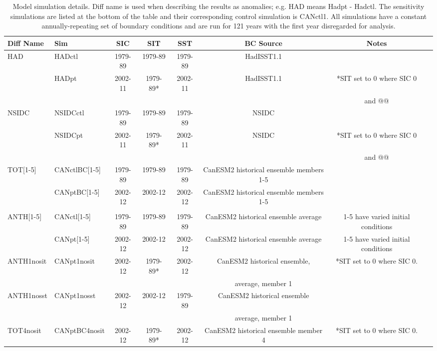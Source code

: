 \documentclass[twocol]{ametsoc}
\begin{document}
\begin{table}[t]
\caption{Model simulation details. Diff name is used when describing the results as anomalies; e.g. HAD means Hadpt - Hadctl. The sensitivity simulations are listed at the bottom of the table and their corresponding control simulation is CANctl1. All simulations have a constant annually-repeating set of boundary conditions and are run for 121 years with the first year disregarded for analysis.}\label{simstbl}
\begin{center}
\begin{tabular}{llcccccc}
\hline\hline
Diff Name & Sim & SIC & SIT & SST & BC Source & Notes\\
\hline
HAD &  HADctl   & 1979-89 & 1979-89 & 1979-89 & HadISST1.1 \\
         & HADpt &   2002-11 & 1979-89* & 2002-11 & HadISST1.1 & *SIT set to 0 where SIC 0 \\
            &                 &               &                &                &                     &     and @@\\
 NSIDC & NSIDCctl  &1979-89 & 1979-89 & 1979-89 & NSIDC \\
             & NSIDCpt &   2002-11 & 1979-89* & 2002-11 & NSIDC & *SIT set to 0 where SIC 0 \\
               &              &                &                 &               &              &   and @@\\
 TOT[1-5] & CANctlBC[1-5] & 1979-89 & 1979-89 & 1979-89  & CanESM2 historical ensemble members 1-5  & \\
                & CANptBC[1-5] &   2002-12 & 2002-12 & 2002-12 &  CanESM2 historical ensemble members 1-5  & \\
 \\
 ANTH[1-5] &  CANctl[1-5] &    1979-89 & 1979-89 & 1979-89 & CanESM2 historical ensemble average & 1-5 have varied initial conditions \\
                   & CANpt[1-5] & 2002-12 & 2002-12 & 2002-12 &  CanESM2 historical ensemble average &  1-5 have varied initial conditions \\
  \hline
 \hline
 ANTH1nosit   & CANpt1nosit &     2002-12 & 1979-89* & 2002-12 &  CanESM2 historical ensemble, & *SIT set to 0 where SIC 0. \\
                       &                       &                 &                  &              &       average, member 1             & \\
ANTH1nosst  &  CANpt1nosst &      2002-12 & 2002-12 & 1979-89 &  CanESM2 historical ensemble  & \\
                        &                       &                 &                  &              &       average, member 1             & \\
TOT4nosit   &  CANptBC4nosit  &    2002-12 & 1979-89* & 2002-12 &  CanESM2 historical ensemble member 4 & *SIT set to 0 where SIC 0. \\
\hline
\end{tabular}
\end{center}
\end{table}
\end{document}
